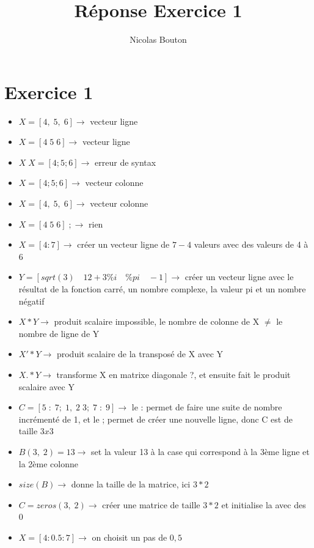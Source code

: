\documentclass[12pt, letterpaper]{article}
\title{Réponse Exercice 1}
\author{Nicolas Bouton}
\begin{document}
\begin{titlepage}
\maketitle
\end{titlepage}

\section{Exercice 1}

\begin{itemize}
\item $X = [4,\; 5, \; 6] \rightarrow$ vecteur ligne
\item $X = [4 \; 5 \; 6] \rightarrow$ vecteur ligne
\item $X\;X = [4;5;6] \rightarrow$ erreur de syntax
\item $X = [4;5;6] \rightarrow$ vecteur colonne
\item $X = [4, \; 5, \; 6] \rightarrow$ vecteur colonne
\item $X = [4 \; 5 \; 6] \; ; \rightarrow$ rien
\item $X = [4:7] \rightarrow$ créer un vecteur ligne de $7-4$ valeurs avec des valeurs de 4 à 6
\item $Y = [sqrt(3) \quad 12+3\%i \quad \%pi \quad -1] \rightarrow$ créer un vecteur ligne avec le résultat de la fonction carré, un nombre complexe, la valeur pi et un nombre négatif
\item $X*Y \rightarrow$ produit scalaire impossible, le nombre de colonne de X $\neq$ le nombre de ligne de Y
\item $X'*Y \rightarrow$ produit scalaire de la transposé de X avec Y
\item $X.*Y \rightarrow$ transforme X en matrixe diagonale ?, et ensuite fait le produit scalaire avec Y
\item $C = [5 \; : \; 7; \; 1, \; 2 \; 3; \; 7 \; : \; 9] \rightarrow$ le : permet de faire une suite de nombre incrémenté de 1, et le ; permet de créer une nouvelle ligne, donc C est de taille $3x3$
\item $B(3, \; 2) = 13 \rightarrow$ set la valeur 13 à la case qui correspond à la 3ème ligne et la 2ème colonne
\item $size(B) \rightarrow$ donne la taille de la matrice, ici $3*2$
\item $C = zeros(3, \; 2) \rightarrow$ créer une matrice de taille $3*2$ et initialise la avec des 0
\item $X = [4:0.5:7] \rightarrow$ on choisit un pas de $0,5$

\end{itemize}
\end{document}
